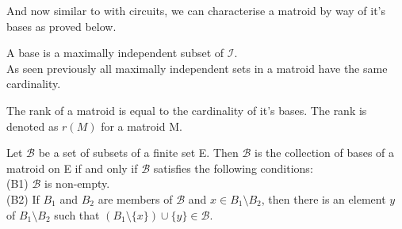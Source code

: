 \documentclass[../main.tex]{subfiles}
\begin{document}
\noindent And now similar to with circuits, we can characterise a matroid by way of it's bases as proved below. 
\begin{defn}
A base is a maximally independent subset of $\mathcal{I}.$\\
\noindent As seen previously all maximally independent sets in a matroid have the same cardinality.
\end{defn}
\begin{defn}
The rank of a matroid is equal to the cardinality of it's bases. The rank is denoted as $r(M)$ for a matroid M.
\end{defn}
\begin{thm}
 Let $\mathcal{B}$ be a set of subsets of a finite set E. Then $\mathcal{B}$ is the collection of bases of a matroid on E if and only if $\mathcal{B}$ satisfies the following conditions:\\
 (B1) $\mathcal{B}$ is non-empty.\\
 (B2) If $B_1$ and $B_2$ are members of $\mathcal{B}$ and $x \in B_1 \setminus B_2$, then there is an element $y$ of $B_1 \setminus B_2$ such that $(B_1 \setminus \{x\}) \cup \{y\} \in \mathcal{B}$.
 \end{thm}
\end{document}
